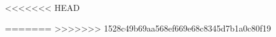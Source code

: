 \newenvironment{styleColorfulGridAccenti}{}{}
\newcommand{\textstyleBookTitle}[1]{#1}
\newcommand{\textstyleSubtleEmphasis}[1]{#1}
\newcommand{\textstylehps}[1]{#1}
<<<<<<< HEAD
\newcommand{\textstyleatn}[1]{#1}


=======
\newcommand{\textstyleatn}[1]{#1}
>>>>>>> 1528c49b69aa568ef669e68c8345d7b1a0c80f19
